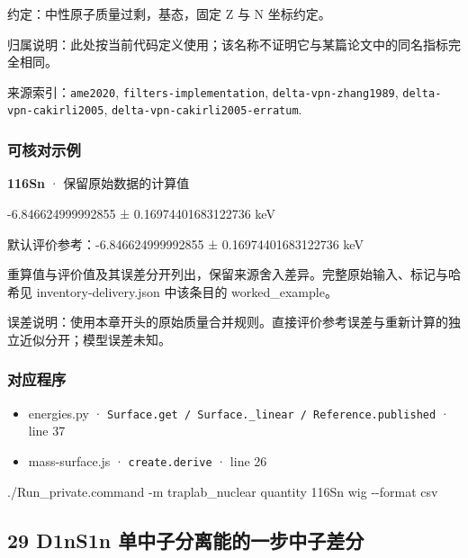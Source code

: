 \documentclass[
  11pt,
  letterpaper,
]{article}
\newenvironment{Shaded}{}{}
\newcommand{\AttributeTok}[1]{\textcolor[rgb]{0.49,0.56,0.16}{#1}}
\newcommand{\ExtensionTok}[1]{#1}
\newcommand{\NormalTok}[1]{#1}
\providecommand{\tightlist}{%
  \setlength{\itemsep}{0pt}\setlength{\parskip}{0pt}}
\begin{document}
约定：中性原子质量过剩，基态，固定 Z 与 N 坐标约定。

归属说明：此处按当前代码定义使用；该名称不证明它与某篇论文中的同名指标完全相同。

来源索引：\texttt{ame2020}, \texttt{filters-implementation},
\texttt{delta-vpn-zhang1989}, \texttt{delta-vpn-cakirli2005},
\texttt{delta-vpn-cakirli2005-erratum}.

\subsubsection{可核对示例}\label{ux53efux6838ux5bf9ux793aux4f8b-27}

\textbf{116Sn} · 保留原始数据的计算值

-6.846624999992855 ± 0.16974401683122736 keV

默认评价参考：-6.846624999992855 ± 0.16974401683122736 keV

重算值与评价值及其误差分开列出，保留来源舍入差异。完整原始输入、标记与哈希见
inventory-delivery.json 中该条目的 worked\_example。

误差说明：使用本章开头的原始质量合并规则。直接评价参考误差与重新计算的独立近似分开；模型误差未知。

\subsubsection{对应程序}\label{ux5bf9ux5e94ux7a0bux5e8f-27}

\begin{itemize}
\tightlist
\item
  energies.py ·
  \texttt{Surface.get\ /\ Surface.\_linear\ /\ Reference.published} ·
  line 37
\item
  mass-surface.js · \texttt{create.derive} · line 26
\end{itemize}

\begin{Shaded}
\begin{Highlighting}[]
\ExtensionTok{./Run\_private.command} \AttributeTok{{-}m}\NormalTok{ traplab\_nuclear quantity 116Sn wig }\AttributeTok{{-}{-}format}\NormalTok{ csv}
\end{Highlighting}
\end{Shaded}

\subsection{29 D1nS1n
单中子分离能的一步中子差分}\label{d1ns1n-ux5355ux4e2dux5b50ux5206ux79bbux80fdux7684ux4e00ux6b65ux4e2dux5b50ux5deeux5206}
\end{document}
